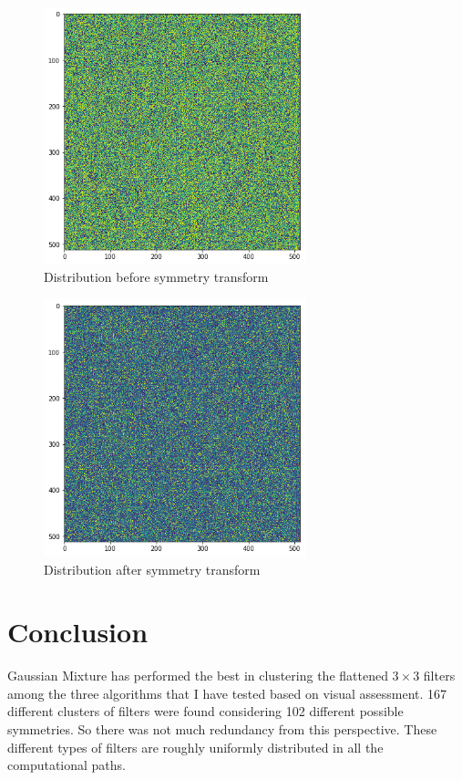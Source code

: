 \documentclass{article} %
\begin{document}
\begin{figure}[H]
	\centering
	\includegraphics[width=3in]{Figures/ul9.png}
	\caption{Distribution before symmetry transform}
	\label{fig:d1}
\end{figure}

\begin{figure}[H]
	\centering
	\includegraphics[width=3in]{Figures/ul10.png}
	\caption{Distribution after symmetry transform}
	\label{fig:d2}
\end{figure}

\section{Conclusion}

Gaussian Mixture has performed the best in clustering the flattened $3 \times 3$ filters among the three algorithms that I have tested based on visual assessment. 167 different clusters of filters were found considering 102 different possible symmetries. So there was not much redundancy from this perspective. These different types of filters are roughly uniformly distributed in all the computational paths.

\small{
\printbibliography
}
\end{document}
